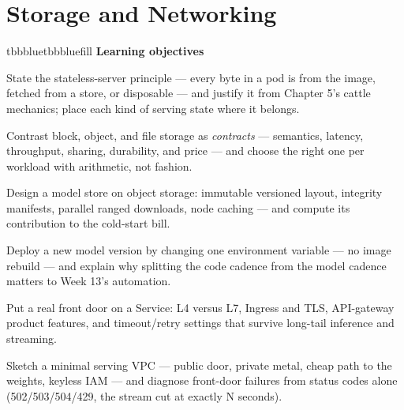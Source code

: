 \setcounter{chapter}{5}
\chapter{Storage and Networking}

\begin{calloutbox}{tbbblue}{tbbbluefill}
{\normalsize\bfseries\color{tbbblue}Learning objectives}\par\vspace{3pt}
\begin{tbbitemize}
  \item State the stateless-server principle — every byte in a pod is from the image, fetched from a store, or disposable — and justify it from Chapter 5's cattle mechanics; place each kind of serving state where it belongs.
  \item Contrast block, object, and file storage as \textit{contracts} — semantics, latency, throughput, sharing, durability, and price — and choose the right one per workload with arithmetic, not fashion.
  \item Design a model store on object storage: immutable versioned layout, integrity manifests, parallel ranged downloads, node caching — and compute its contribution to the cold-start bill.
  \item Deploy a new model version by changing one environment variable — no image rebuild — and explain why splitting the code cadence from the model cadence matters to Week 13's automation.
  \item Put a real front door on a Service: L4 versus L7, Ingress and TLS, API-gateway product features, and timeout/retry settings that survive long-tail inference and streaming.
  \item Sketch a minimal serving VPC — public door, private metal, cheap path to the weights, keyless IAM — and diagnose front-door failures from status codes alone (502/503/504/429, the stream cut at exactly N seconds).
\end{tbbitemize}
\end{calloutbox}

\vspace{5.0pt}

